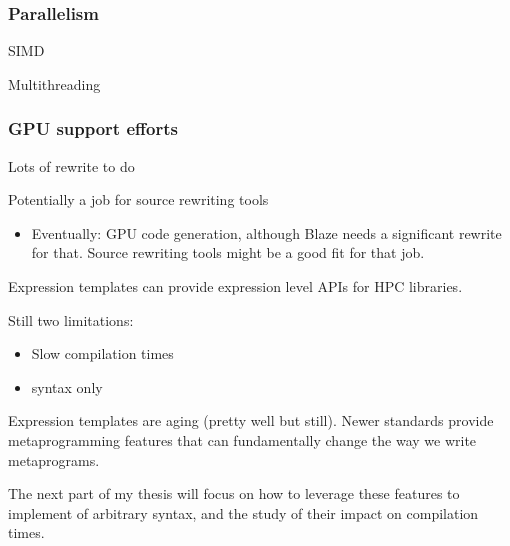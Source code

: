 \documentclass[../main]{subfiles}
\begin{document}
\subsubsection{
  Parallelism
}

SIMD

Multithreading

\subsubsection{
  GPU support efforts
}

Lots of rewrite to do

Potentially a job for source rewriting tools

\begin{itemize}
\item Eventually: GPU code generation, although Blaze needs a significant
      rewrite for that. Source rewriting tools might be a good fit for that job.
\end{itemize}

Expression templates can provide expression level APIs for HPC libraries.

Still two limitations:

\begin{itemize}
\item Slow compilation times
\item \cpp syntax only
\end{itemize}

Expression templates are aging (pretty well but still).
Newer \cpp standards provide metaprogramming features that can fundamentally
change the way we write metaprograms.

The next part of my thesis will focus on how to leverage these features to
implement \dsel of arbitrary syntax, and the study of their impact on
compilation times.
\end{document}
